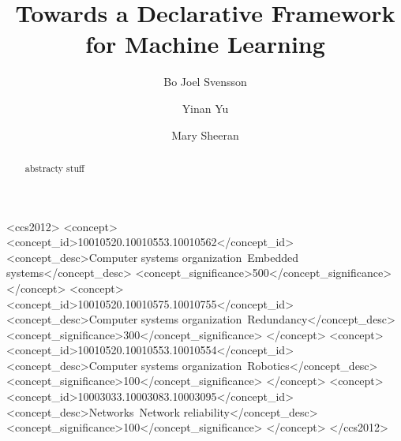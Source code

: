 \documentclass[sigplan,anonymous,review]{acmart}
\begin{document}
\title{Towards a Declarative Framework for Machine Learning}


\author{Bo Joel Svensson}
\author{Yinan Yu}
\author{Mary Sheeran}

\renewcommand{\shortauthors}{Svensson, et al.}

\begin{abstract}

  abstracty stuff

\end{abstract}

\begin{CCSXML}
<ccs2012>
 <concept>
  <concept_id>10010520.10010553.10010562</concept_id>
  <concept_desc>Computer systems organization~Embedded systems</concept_desc>
  <concept_significance>500</concept_significance>
 </concept>
 <concept>
  <concept_id>10010520.10010575.10010755</concept_id>
  <concept_desc>Computer systems organization~Redundancy</concept_desc>
  <concept_significance>300</concept_significance>
 </concept>
 <concept>
  <concept_id>10010520.10010553.10010554</concept_id>
  <concept_desc>Computer systems organization~Robotics</concept_desc>
  <concept_significance>100</concept_significance>
 </concept>
 <concept>
  <concept_id>10003033.10003083.10003095</concept_id>
  <concept_desc>Networks~Network reliability</concept_desc>
  <concept_significance>100</concept_significance>
 </concept>
</ccs2012>
\end{CCSXML}



\end{document}
